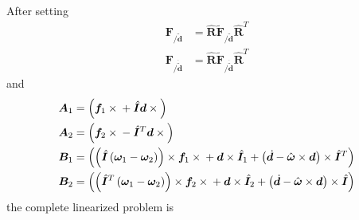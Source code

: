 \documentclass[10pt,dvips,fleqn,subeqn]{report}
\newcommand{\T}[1]{\bm{#1}}
\newcommand{\TT}[1]{\bm{#1}}
\begin{document}
After setting
\begin{subequations}
\begin{align}
	\T{F}_{/\tilde{\T{d}}} &=
		\hat{\T{R}} \tilde{\T{F}}_{/\tilde{\T{d}}} \hat{\T{R}}^T \\
	\T{F}_{/\dot{\tilde{\T{d}}}} &=
		\hat{\T{R}} \tilde{\T{F}}_{/\dot{\tilde{\T{d}}}} \hat{\T{R}}^T
\end{align}
\end{subequations}
and
\begin{subequations}
\label{sec:deformable-displacement-joint-invariant-linearization-helpers}
\begin{align}
	\TT{A}_1 &= \plbr{\T{f}_1\times{} + \hat{\TT{I}}\T{d}\times{}} \\
	\TT{A}_2 &= \plbr{\T{f}_2\times{} - \hat{\TT{I}}^T\T{d}\times{}} \\
	\TT{B}_1 &= \plbr{
			\plbr{\hat{\T{I}}\plbr{\T{\omega}_1 - \T{\omega}_2}}\times\T{f}_1\times{}
			+ \T{d}\times\hat{\T{I}}_1
			+ \plbr{\dot{\T{d}} - \hat{\T{\omega}}\times\T{d}}\times\hat{\T{I}}^T
		} \\
	\TT{B}_2 &= \plbr{
			\plbr{\hat{\T{I}}^T\plbr{\T{\omega}_1 - \T{\omega}_2}}\times\T{f}_2\times{}
			+ \T{d}\times\hat{\T{I}}_2
			+ \plbr{\dot{\T{d}} - \hat{\T{\omega}}\times\T{d}}\times\hat{\T{I}}
		}
\end{align}
\end{subequations}
the complete linearized problem is
\end{document}
